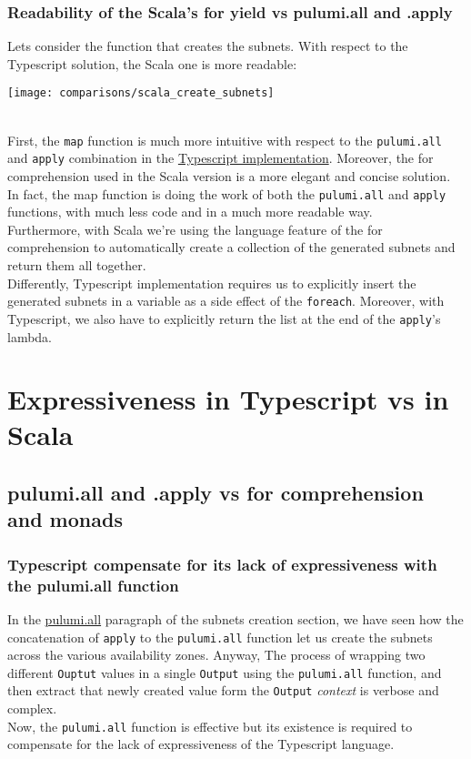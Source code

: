 \subsubsection{Readability of the Scala's for yield vs pulumi.all and .apply}
\label{sssec:readability-for-yield}
Lets consider the function that creates the subnets.
With respect to the Typescript solution, the Scala one is more readable:
\begin{center}
  \texttt{[image: comparisons/scala\_create\_subnets]} 
\end{center}\mbox{}\\
First, the \texttt{map} function is much more intuitive with respect to the \texttt{pulumi.all} and \texttt{apply} combination in the \hyperref[sssec:ts-subnets-comparison]{Typescript implementation}.
Moreover, the for comprehension used in the Scala version is a more elegant and concise solution.
In fact, the map function is doing the work of both the \texttt{pulumi.all} and \texttt{apply} functions, with much less code and in a much more readable way.\\
Furthermore, with Scala we're using the language feature of the for comprehension to automatically create a collection of the generated subnets and return them all together.\\
Differently, Typescript implementation requires us to explicitly insert the generated subnets in a variable as a side effect of the \texttt{foreach}.
Moreover, with Typescript, we also have to explicitly return the list at the end of the \texttt{apply}'s lambda.


\section{Expressiveness in Typescript vs in Scala}

\subsection{pulumi.all and .apply vs for comprehension and monads}

\subsubsection{Typescript compensate for its lack of expressiveness with the pulumi.all function}
In the \hyperref[sssec:pulumi-all]{pulumi.all} paragraph of the subnets creation section, we have seen how the concatenation of \texttt{apply} to the \texttt{pulumi.all} function let us create the subnets across the various availability zones.
Anyway, The process of wrapping two different \texttt{Ouptut} values in a single \texttt{Output} using the \texttt{pulumi.all} function, and then extract that newly created value form the \texttt{Output} \textit{context} is verbose and complex.\\
Now, the \texttt{pulumi.all} function is effective but its existence is required to compensate for the lack of expressiveness of the Typescript language.

